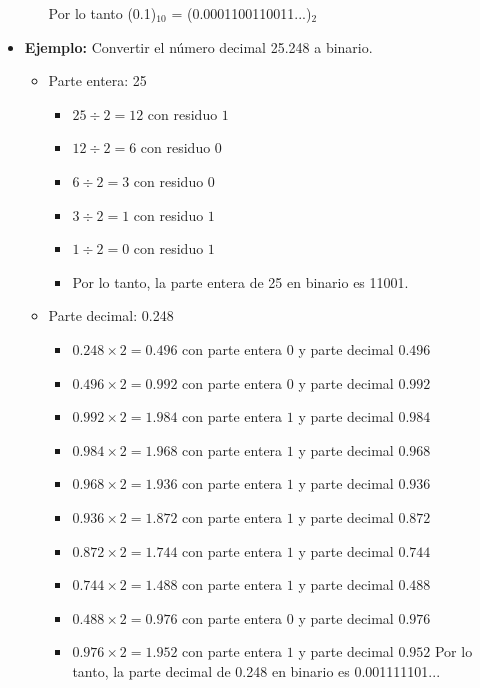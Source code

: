 \documentclass{templateNote}
\begin{document}
\begin{itemize}
\begin{itemize}
        Por lo tanto (0.1)$_{10}$ = (0.0001100110011...)$_2$
    \end{itemize}
    \item \textbf{Ejemplo:} Convertir el número decimal 25.248 a binario.
    \begin{itemize}
        \item Parte entera: 25
        \begin{itemize}
            \item $25 \div 2 = 12$ con residuo $1$
            \item $12 \div 2 = 6$ con residuo $0$
            \item $6 \div 2 = 3$ con residuo $0$
            \item $3 \div 2 = 1$ con residuo $1$
            \item $1 \div 2 = 0$ con residuo $1$
            \item Por lo tanto, la parte entera de 25 en binario es 11001.
        \end{itemize}
        \item Parte decimal: 0.248
        \begin{itemize}
            \item $0.248 \times 2 = 0.496$ con parte entera $0$ y parte decimal $0.496$
            \item $0.496 \times 2 = 0.992$ con parte entera $0$ y parte decimal $0.992$
            \item $0.992 \times 2 = 1.984$ con parte entera $1$ y parte decimal $0.984$
            \item $0.984 \times 2 = 1.968$ con parte entera $1$ y parte decimal $0.968$
            \item $0.968 \times 2 = 1.936$ con parte entera $1$ y parte decimal $0.936$
            \item $0.936 \times 2 = 1.872$ con parte entera $1$ y parte decimal $0.872$
            \item $0.872 \times 2 = 1.744$ con parte entera $1$ y parte decimal $0.744$
            \item $0.744 \times 2 = 1.488$ con parte entera $1$ y parte decimal $0.488$
            \item $0.488 \times 2 = 0.976$ con parte entera $0$ y parte decimal $0.976$
            \item $0.976 \times 2 = 1.952$ con parte entera $1$ y parte decimal $0.952$
            Por lo tanto, la parte decimal de 0.248 en binario es 0.001111101...
        \end{itemize}

\end{itemize}
\end{itemize}
\end{document}
